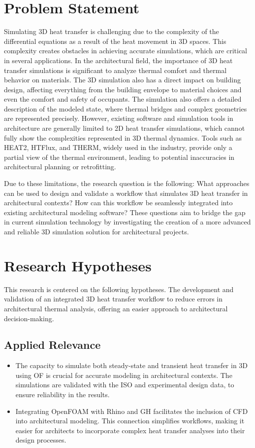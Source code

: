 \section{Problem Statement}
Simulating 3D heat transfer is challenging due to the complexity of the differential equations as a result of the heat movement in 3D spaces. This complexity creates obstacles in achieving accurate simulations, which are critical in several applications. In the architectural field, the importance of 3D heat transfer simulations is significant to analyze thermal comfort and thermal behavior on materials. The 3D simulation also has a direct impact on building design, affecting everything from the building envelope to material choices and even the comfort and safety of occupants. The simulation also offers a detailed description of the modeled state, where thermal bridges and complex geometries are represented precisely.
However, existing software and simulation tools in architecture are generally limited to 2D heat transfer simulations, which cannot fully show the complexities represented in 3D thermal dynamics. Tools such as HEAT2, HTFlux, and THERM, widely used in the industry, provide only a partial view of the thermal environment, leading to potential inaccuracies in architectural planning or retrofitting.

Due to these limitations, the research question is the following: What approaches can be used to design and validate a workflow that simulates 3D heat transfer in architectural contexts? How can this workflow be seamlessly integrated into existing architectural modeling software? These questions aim to bridge the gap in current simulation technology by investigating the creation of a more advanced and reliable 3D simulation solution for architectural projects.

\section{Research Hypotheses}
This research is centered on the following hypotheses.
The development and validation of an integrated 3D heat transfer workflow to reduce errors in architectural thermal analysis, offering an easier approach to architectural decision-making.

\subsection{Applied Relevance}
\begin{itemize}
    \item The capacity to simulate both steady-state and transient heat transfer in \gls{3D} using \gls{OF} is crucial for accurate modeling in architectural contexts. The simulations are validated with the \gls{ISO} and experimental design data, to ensure reliability in the results.
    \item Integrating OpenFOAM with Rhino and \gls{GH} facilitates the inclusion of \gls{CFD} into architectural modeling. This connection simplifies workflows, making it easier for architects to incorporate complex heat transfer analyses into their design processes.
\end{itemize}

